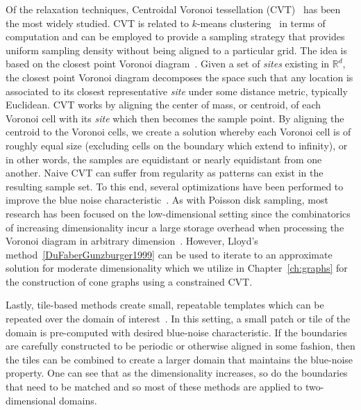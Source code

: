 Of the relaxation techniques, Centroidal Voronoi tessellation (CVT)~\cite{DuFaberGunzburger1999} has been the most widely studied.
%
CVT is related to $k$-means clustering~\cite{HastieTibshiraniFriedman2008} in terms of computation and can be employed to provide a sampling strategy that provides uniform sampling density without being aligned to a particular grid.
%
The idea is based on the closest point Voronoi diagram~\cite{deBergCheongKreveld2008}.
%
Given a set of \emph{sites} existing in $\mathbb{R}^d$, the closest point Voronoi diagram decomposes the space such that any location is associated to its closest representative \emph{site} under some distance metric, typically Euclidean.
%
CVT works by aligning the center of mass, or centroid, of each Voronoi cell with its \emph{site} which then becomes the sample point.
%
By aligning the centroid to the Voronoi cells, we create a solution whereby each Voronoi cell is of roughly equal size (excluding cells on the boundary which extend to infinity), or in other words, the samples are equidistant or nearly equidistant from one another.
%
Naive CVT can suffer from regularity as patterns can exist in the resulting sample set.
%
To this end, several optimizations have been performed to improve the blue noise characteristic~\cite{BalzerSchlomerDeussen2009,ChenYuanChoi2012,deGoesBreedenOstromoukhov2012,XuLiuGotsman2011}.
%
As with Poisson disk sampling, most research has been focused on the low-dimensional setting since the combinatorics of increasing dimensionality incur a large storage overhead when processing the Voronoi diagram in arbitrary dimension~\cite{BoissonnatChazalYvinec2017}.
%
However, Lloyd's method~\ref{DuFaberGunzburger1999} can be used to iterate to an approximate solution for moderate dimensionality which we utilize in Chapter~\ref{ch:graphs} for the construction of cone graphs using a constrained CVT. 

Lastly, tile-based methods create small, repeatable templates which can be repeated over the domain of interest~\cite{HillerDeussenKeller2001,KopfCohenOrDeussen2006,LagaeDutre2005,Ostromoukhov2007,OstromoukhovDonohueJodoin2004,WachtelPilleboueCoeurjolly2014}.
%
In this setting, a small patch or tile of the domain is pre-computed with desired blue-noise characteristic.
%
If the boundaries are carefully constructed to be periodic or otherwise aligned in some fashion, then the tiles can be combined to create a larger domain that maintains the blue-noise property.
%
One can see that as the dimensionality increases, so do the boundaries that need to be matched and so most of these methods are applied to two-dimensional domains.

